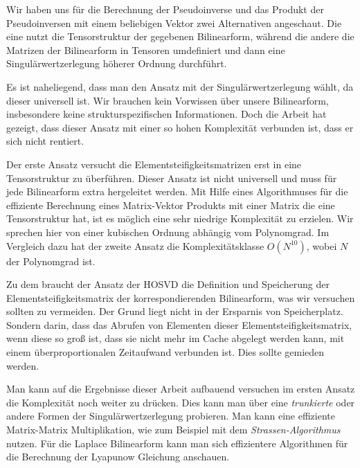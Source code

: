 Wir haben uns für die Berechnung der Pseudoinverse und das Produkt der Pseudoinversen mit einem beliebigen Vektor zwei Alternativen angeschaut. Die eine nutzt die Tensorstruktur der gegebenen Bilinearform, während die andere die Matrizen der Bilinearform in Tensoren umdefiniert und dann eine Singulärwertzerlegung höherer Ordnung durchführt.

Es ist naheliegend, dass man den Ansatz mit der Singulärwertzerlegung wählt, da dieser universell ist. Wir brauchen kein Vorwissen über unsere Bilinearform, insbesondere keine strukturspezifischen Informationen.
Doch die Arbeit hat gezeigt, dass dieser Ansatz mit einer so hohen Komplexität verbunden ist, dass er sich nicht rentiert.

Der erste Ansatz versucht die Elementsteifigkeitsmatrizen erst in eine Tensorstruktur zu überführen. Dieser Ansatz ist nicht universell und muss für jede Bilinearform extra hergeleitet werden. Mit Hilfe eines Algorithmuses für die effiziente Berechnung eines Matrix-Vektor Produkts mit einer Matrix die eine Tensorstruktur hat, ist es möglich eine sehr niedrige Komplexität zu erzielen. Wir sprechen hier von einer kubischen Ordnung abhängig vom Polynomgrad. Im Vergleich dazu hat der zweite Ansatz die Komplexitätsklasse $O(N^{10})$, wobei $N$ der Polynomgrad ist. 


Zu dem braucht der Ansatz der HOSVD die Definition und Speicherung der Elementsteifigkeitsmatrix der korrespondierenden Bilinearform, was wir versuchen sollten zu vermeiden. Der Grund liegt nicht in der Ersparnis von Speicherplatz. Sondern darin, dass das Abrufen von Elementen dieser Elementsteifigkeitsmatrix, wenn diese so groß ist, dass sie nicht mehr im Cache abgelegt werden kann, mit einem überproportionalen Zeitaufwand verbunden ist. Dies sollte gemieden werden.

Man kann auf die Ergebnisse dieser Arbeit aufbauend versuchen im ersten Ansatz die Komplexität noch weiter zu drücken. Dies kann man über eine \textit{trunkierte} oder andere Formen der Singulärwertzerlegung probieren. Man kann eine effiziente Matrix-Matrix Multiplikation, wie zum Beispiel mit dem \textit{Strassen-Algorithmus} nutzen. Für die Laplace Bilinearform kann man sich effizientere Algorithmen für die Berechnung der Lyapunow Gleichung anschauen.


